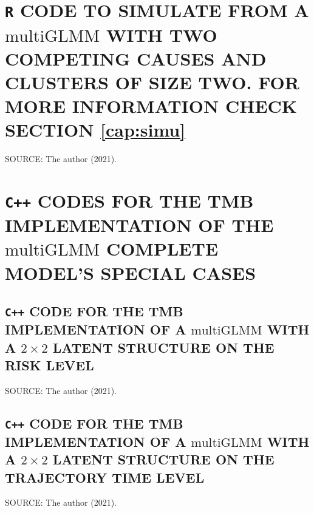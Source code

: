 \documentclass[12pt, %
               openright, %
               oneside, %
               a4paper, %
               chapter=TITLE, %
               section=TITLE, %
               brazil,
               english %
]{abntex2}
\begin{document}
\begin{apendicesenv}
\chapter{\texttt{R} CODE TO SIMULATE FROM A \(\text{multiGLMM}\) WITH
         TWO COMPETING CAUSES AND CLUSTERS OF SIZE TWO. FOR MORE
         INFORMATION CHECK SECTION \ref{cap:simu}}
\label{cap:appendixC}


\vspace{-0.5cm}
\begin{center}
 \begin{footnotesize}
  SOURCE: The author (2021).
 \end{footnotesize}
\end{center}

\chapter{\texttt{C++} CODES FOR THE TMB IMPLEMENTATION OF THE
         \(\text{multiGLMM}\) COMPLETE MODEL'S SPECIAL CASES}
\label{cap:appendixD}

\section{\texttt{C++} CODE FOR THE TMB IMPLEMENTATION OF A
         \(\text{multiGLMM}\) WITH A \(2\times2\) LATENT STRUCTURE ON
         THE RISK LEVEL}
\label{cap:riskModel}


\vspace{-0.5cm}
\begin{center}
 \begin{footnotesize}
  SOURCE: The author (2021).
 \end{footnotesize}
\end{center}

\section{\texttt{C++} CODE FOR THE TMB IMPLEMENTATION OF A
         \(\text{multiGLMM}\) WITH A \(2\times2\) LATENT STRUCTURE ON
         THE TRAJECTORY TIME LEVEL}
\label{cap:timeModel}


\vspace{-0.5cm}
\begin{center}
 \begin{footnotesize}
  SOURCE: The author (2021).
 \end{footnotesize}
\end{center}


\end{apendicesenv}
\end{document}
